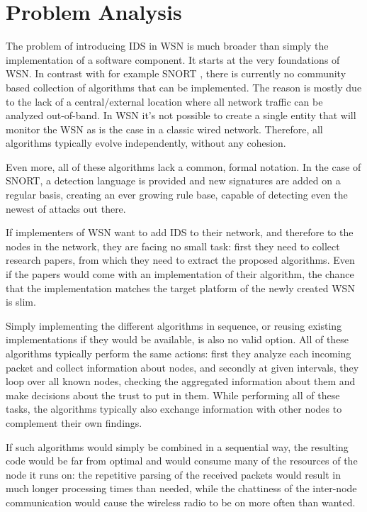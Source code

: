 \documentclass[conference]{IEEEtran}
\begin{document}
\section{Problem Analysis}
\label{section:problem}

The problem of introducing IDS in WSN is much broader than simply the
implementation of a software component. It starts at the very foundations of
WSN. In contrast with for example SNORT \cite{roesch1999snort}, there is
currently no community based collection of algorithms that can be implemented.
The reason is mostly due to the lack of a central/external location where all
network traffic can be analyzed out-of-band. In WSN it's not possible to create
a single entity that will monitor the WSN as is the case in a classic wired
network. Therefore, all algorithms typically evolve independently, without any
cohesion.

Even more, all of these algorithms lack a common, formal notation. In the case
of SNORT, a detection language is provided and new signatures are added on a
regular basis, creating an ever growing rule base, capable of detecting even
the newest of attacks out there.

If implementers of WSN want to add IDS to their network, and therefore to the
nodes in the network, they are facing no small task: first they need to collect
research papers, from which they need to extract the proposed algorithms. Even
if the papers would come with an implementation of their algorithm, the chance
that the implementation matches the target platform of the newly created WSN is
slim.

Simply implementing the different algorithms in sequence, or reusing existing
implementations if they would be available, is also no valid option. All of
these algorithms typically perform the same actions: first they analyze each
incoming packet and collect information about nodes, and secondly at given
intervals, they loop over all known nodes, checking the aggregated information
about them and make decisions about the trust to put in them. While performing
all of these tasks, the algorithms typically also exchange information with
other nodes to complement their own findings.

If such algorithms would simply be combined in a sequential way, the resulting
code would be far from optimal and would consume many of the resources of the
node it runs on: the repetitive parsing of the received packets would result in
much longer processing times than needed, while the chattiness of the
inter-node communication would cause the wireless radio to be on more often
than wanted.
\end{document}
